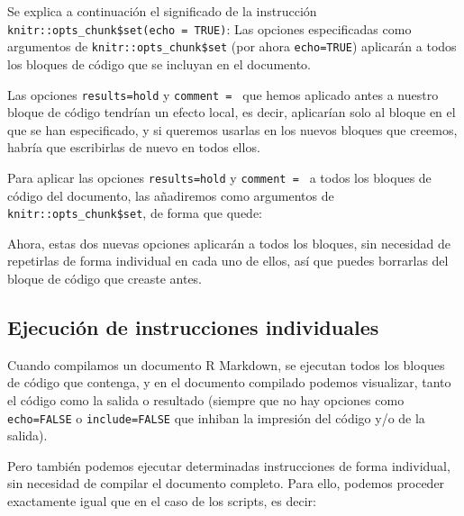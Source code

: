\documentclass[
  title=normal,
  notoc,
  bib=normal]{mnye}
\newenvironment{Shaded}{\begin{snugshade}}{\end{snugshade}}
\newcommand{\NormalTok}[1]{#1}
\begin{document}
Se explica a continuación el significado de la instrucción \texttt{knitr::opts\_chunk\$set(echo\ =\ TRUE)}: Las opciones especificadas como argumentos de \texttt{knitr::opts\_chunk\$set} (por ahora \texttt{echo=TRUE}) aplicarán a todos los bloques de código que se incluyan en el documento.

Las opciones \texttt{results=\textquotesingle{}hold\textquotesingle{}} y \texttt{comment\ =\ \textquotesingle{}\textquotesingle{}} que hemos aplicado antes a nuestro bloque de código tendrían un efecto local, es decir, aplicarían solo al bloque en el que se han especificado, y si queremos usarlas en los nuevos bloques que creemos, habría que escribirlas de nuevo en todos ellos.

Para aplicar las opciones \texttt{results=\textquotesingle{}hold\textquotesingle{}} y \texttt{comment\ =\ \textquotesingle{}\textquotesingle{}} a todos los bloques de código del documento, las añadiremos como argumentos de \texttt{knitr::opts\_chunk\$set}, de forma que quede:

\begin{Shaded}
\end{Shaded}

Ahora, estas dos nuevas opciones aplicarán a todos los bloques, sin necesidad de repetirlas de forma individual en cada uno de ellos, así que puedes borrarlas del bloque de código que creaste antes.

\hypertarget{ejecuciuxf3n-de-instrucciones-individuales}{%
\subsection{Ejecución de instrucciones individuales}\label{ejecuciuxf3n-de-instrucciones-individuales}}

Cuando compilamos un documento R Markdown, se ejecutan todos los bloques de código que contenga, y en el documento compilado podemos visualizar, tanto el código como la salida o resultado (siempre que no hay opciones como \texttt{echo=FALSE} o \texttt{include=FALSE} que inhiban la impresión del código y/o de la salida).

Pero también podemos ejecutar determinadas instrucciones de forma individual, sin necesidad de compilar el documento completo.
Para ello, podemos proceder exactamente igual que en el caso de los scripts, es decir:
\end{document}
